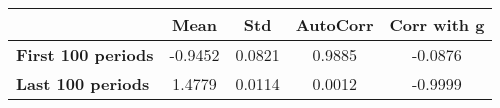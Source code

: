 \begin{tiny}\begin{tabular}{|l|c|c|c|c|}
\hline
&\textbf{Mean}&\textbf{Std}&\textbf{AutoCorr}&\textbf{Corr with g}\\\hline
\textbf{First 100 periods}&-0.9452&0.0821&0.9885&-0.0876\\\hline
\textbf{Last 100 periods}&1.4779&0.0114&0.0012&-0.9999\\\hline
\end{tabular}
\end{tiny}